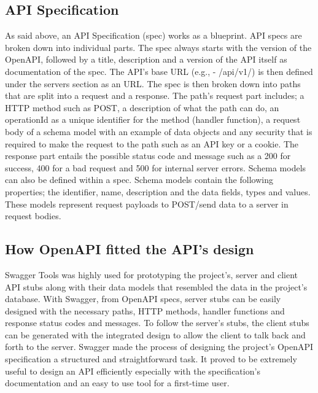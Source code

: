 \subsection{API Specification}
As said above, an API Specification (spec) works as a blueprint. API specs are broken down into individual parts. The spec always starts with the version of the OpenAPI, followed by a title, description and a version of the API itself as documentation of the spec. The API's base URL (e.g., - /api/v1/) is then defined under the servers section as an URL. The spec is then broken down into paths that are split into a request and a response. The path's request part includes; a HTTP method such as POST, a description of what the path can do, an operationId as a unique identifier for the method (handler function), a request body of a schema model with an example of data objects and any security that is required to make the request to the path such as an API key or a cookie. The response part entails the possible status code and message such as a 200 for success, 400 for a bad request and 500 for internal server errors. Schema models can also be defined within a spec. Schema models contain the following properties; the identifier, name, description and the data fields, types and values. These models represent request payloads to POST/send data to a server in request bodies. \cite{ref6}

\subsection{How OpenAPI fitted the API's design}
Swagger Tools was highly used for prototyping the project's, server and client API stubs along with their data models that resembled the data in the project's database. With Swagger, from OpenAPI specs, server stubs can be easily designed with the necessary paths, HTTP methods, handler functions and response status codes and messages. To follow the server's stubs, the client stubs can be generated with the integrated design to allow the client to talk back and forth to the server. Swagger made the process of designing the project's OpenAPI specification a structured and straightforward task. It proved to be extremely useful to design an API efficiently especially with the specification's documentation and an easy to use tool for a first-time user.


